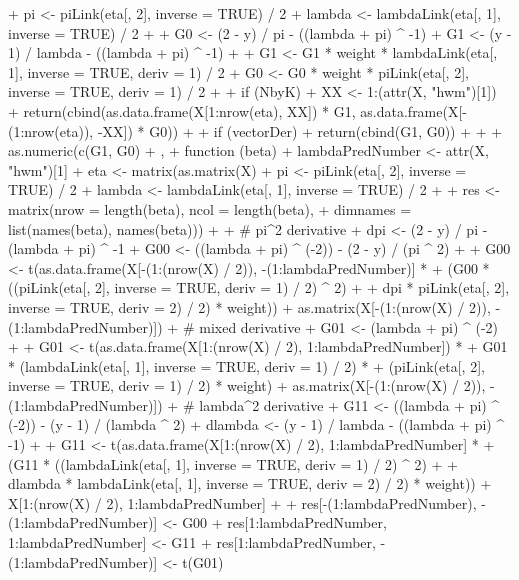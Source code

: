 \documentclass[
]{jss}
\newcommand{\1}{\mathcal{I}} \newcommand{\bZero}{\boldsymbol{0}}
\begin{document}
\begin{CodeChunk}
\begin{CodeInput}
{{{+         pi     <-     piLink(eta[, 2], inverse = TRUE) / 2
+         lambda <- lambdaLink(eta[, 1], inverse = TRUE) / 2
+         
+         G0 <- (2 - y) / pi     - ((lambda + pi) ^ -1)
+         G1 <- (y - 1) / lambda - ((lambda + pi) ^ -1)
+         
+         G1 <- G1 * weight * lambdaLink(eta[, 1], inverse = TRUE, deriv = 1) / 2
+         G0 <- G0 * weight *     piLink(eta[, 2], inverse = TRUE, deriv = 1) / 2
+         
+         if (NbyK) {
+           XX <- 1:(attr(X, "hwm")[1])
+           return(cbind(as.data.frame(X[1:nrow(eta), XX]) * G1, as.data.frame(X[-(1:nrow(eta)), -XX]) * G0))
+         }
+         if (vectorDer) {
+           return(cbind(G1, G0))
+         }
+         
+         as.numeric(c(G1, G0) %
+       },
+       function (beta) {
+         lambdaPredNumber <- attr(X, "hwm")[1]
+         eta <- matrix(as.matrix(X) %
+         pi     <-     piLink(eta[, 2], inverse = TRUE) / 2
+         lambda <- lambdaLink(eta[, 1], inverse = TRUE) / 2
+ 
+         res <- matrix(nrow = length(beta), ncol = length(beta), 
+                       dimnames = list(names(beta), names(beta)))
+         
+         # pi^2 derivative
+         dpi <- (2 - y) / pi - (lambda + pi) ^ -1
+         G00 <- ((lambda + pi) ^ (-2)) - (2 - y) / (pi ^ 2)
+         
+         G00 <- t(as.data.frame(X[-(1:(nrow(X) / 2)), -(1:lambdaPredNumber)] * 
+         (G00 * ((piLink(eta[, 2], inverse = TRUE, deriv = 1) / 2) ^ 2) + 
+         dpi * piLink(eta[, 2], inverse = TRUE, deriv = 2) / 2) * weight)) %
+         as.matrix(X[-(1:(nrow(X) / 2)), -(1:lambdaPredNumber)])
+         # mixed derivative
+         G01 <- (lambda + pi) ^ (-2)
+         
+         G01 <- t(as.data.frame(X[1:(nrow(X) / 2), 1:lambdaPredNumber]) * 
+         G01 * (lambdaLink(eta[, 1], inverse = TRUE, deriv = 1) / 2) * 
+         (piLink(eta[, 2], inverse = TRUE, deriv = 1) / 2) * weight) %
+         as.matrix(X[-(1:(nrow(X) / 2)), -(1:lambdaPredNumber)])
+         # lambda^2 derivative
+         G11 <- ((lambda + pi) ^ (-2)) - (y - 1) / (lambda ^ 2)
+         dlambda <- (y - 1) / lambda - ((lambda + pi) ^ -1)
+         
+         G11 <- t(as.data.frame(X[1:(nrow(X) / 2), 1:lambdaPredNumber] * 
+         (G11 * ((lambdaLink(eta[, 1], inverse = TRUE, deriv = 1) / 2) ^ 2) + 
+         dlambda * lambdaLink(eta[, 1], inverse = TRUE, deriv = 2) / 2) * weight)) %
+         X[1:(nrow(X) / 2), 1:lambdaPredNumber]
+         
+         res[-(1:lambdaPredNumber), -(1:lambdaPredNumber)] <- G00
+         res[1:lambdaPredNumber, 1:lambdaPredNumber] <- G11
+         res[1:lambdaPredNumber, -(1:lambdaPredNumber)] <- t(G01)
}}}
\end{CodeInput}
\end{CodeChunk}
\end{document}
